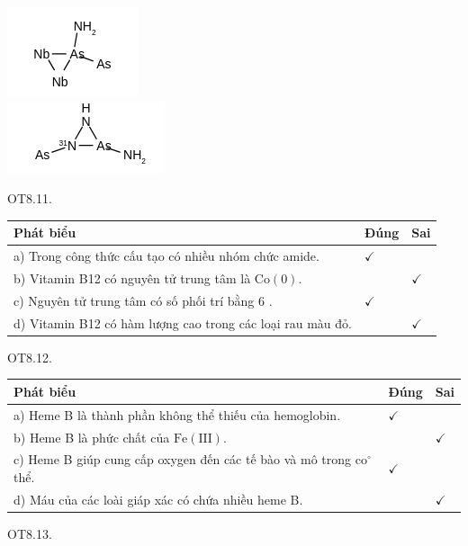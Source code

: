 \documentclass[10pt]{article}
\begin{document}
\includegraphics{smile-881b78e5f26438a8418022da3b2ba420f8aa7eb9}\\
\includegraphics{smile-36af9324b0bd743a9c9e35409e22f47341a7e58e}

OT8.11.

\begin{center}
\begin{tabular}{|l|l|l|}
\hline
Phát biểu & Đúng & Sai \\
\hline
a) Trong công thức cấu tạo có nhiều nhóm chức amide. & $\checkmark$ &  \\
\hline
b) Vitamin B12 có nguyên tử trung tâm là $\mathrm{Co}(0)$. &  & $\checkmark$ \\
\hline
c) Nguyên tử trung tâm có số phối trí bằng 6 . & $\checkmark$ &  \\
\hline
d) Vitamin B12 có hàm lượng cao trong các loại rau màu đỏ. &  & $\checkmark$ \\
\hline
\end{tabular}
\end{center}

OT8.12.

\begin{center}
\begin{tabular}{|l|l|l|}
\hline
Phát biểu & Đúng & Sai \\
\hline
a) Heme B là thành phần không thể thiếu của hemoglobin. & $\checkmark$ &  \\
\hline
b) Heme B là phức chất của $\mathrm{Fe}(\mathrm{III})$. &  & $\checkmark$ \\
\hline
c) Heme B giúp cung cấp oxygen đến các tế bào và mô trong $\mathrm{co}^{\circ}$ thể. & $\checkmark$ &  \\
\hline
d) Máu của các loài giáp xác có chứa nhiều heme B. &  & $\checkmark$ \\
\hline
\end{tabular}
\end{center}

OT8.13.
\end{document}
